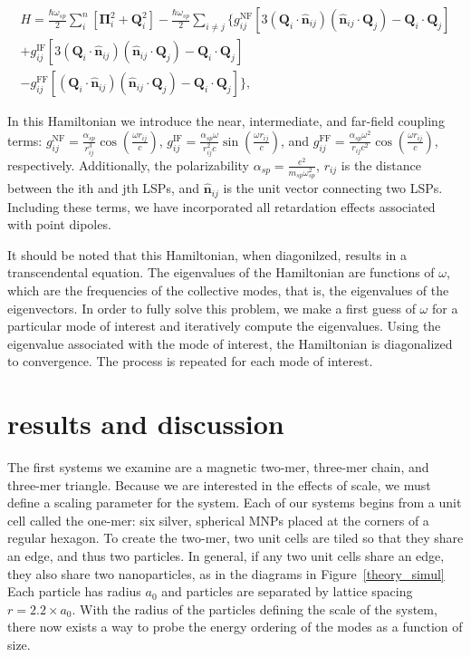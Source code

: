 \documentclass[journal=apchd5,manuscript=article]{achemso}
\begin{document}
\begin{equation}
\begin{aligned}
H = 
\frac{\hbar\omega_{sp}}{2}\sum_{i}^{n}[\boldsymbol{\Pi}_i^2 + \textbf{Q}_i^2] - \frac{\hbar\omega_{sp}}{2}\sum_{i\neq j}\{g_{ij}^{\textrm{NF}}\left[3(\textbf{Q}_i\cdot\hat{\textbf{n}}_{ij})(\hat{\textbf{n}}_{ij}\cdot\textbf{Q}_j) - \textbf{Q}_i\cdot\textbf{Q}_j\right] \\
+ g_{ij}^{\textrm{IF}}\left[3(\textbf{Q}_i\cdot\hat{\textbf{n}}_{ij})(\hat{\textbf{n}}_{ij}\cdot\textbf{Q}_j) -\textbf{Q}_i\cdot\textbf{Q}_j\right] \\ 
- g_{ij}^{\textrm{FF}}\left[(\textbf{Q}_i\cdot\hat{\textbf{n}}_{ij})(\hat{\textbf{n}}_{ij}\cdot\textbf{Q}_j) -\textbf{Q}_i\cdot\textbf{Q}_j\right]\},\label{elec_hammy_2}
\end{aligned}
\end{equation}

In this Hamiltonian we introduce the near, intermediate, and far-field coupling terms: $g_{ij}^{\textrm{NF}} = \frac{\alpha_{sp}}{r_{ij}^3}\cos\left(\frac{\omega r_{ij}}{c}\right)$, $g_{ij}^{\textrm{IF}} = \frac{\alpha_{sp}\omega}{r_{ij}^2 c}\sin\left(\frac{\omega r_{ij}}{c}\right)$, and $g_{ij}^{\textrm{FF}} = \frac{\alpha_{sp}\omega^2}{r_{ij} c^2}\cos\left(\frac{\omega r_{ij}}{c}\right)$, respectively. Additionally, the polarizability $\alpha_{sp} = \frac{e^2}{m_{sp}\omega_{sp}^2}$, $r_{ij}$ is the distance between the ith and jth LSPs, and $\hat{\textbf{n}}_{ij}$ is the unit vector connecting two LSPs. Including these terms, we have incorporated all retardation effects associated with point dipoles\cite{Purcell1973}.

It should be noted that this Hamiltonian, when diagonilzed, results in a transcendental equation. The eigenvalues of the Hamiltonian are functions of $\omega$, which are the frequencies of the collective modes, that is, the eigenvalues of the eigenvectors. In order to fully solve this problem, we make a first guess of $\omega$ for a particular mode of interest and iteratively compute the eigenvalues. Using the eigenvalue associated with the mode of interest, the Hamiltonian is diagonalized to convergence. The process is repeated for each mode of interest.

\section{results and discussion}
The first systems we examine are a magnetic two-mer\cite{Cherqui2014}, three-mer chain, and three-mer triangle. Because we are interested in the effects of scale, we must define a scaling parameter for the system. Each of our systems begins from a unit cell called the one-mer: six silver, spherical MNPs placed at the corners of a regular hexagon. To create the two-mer, two unit cells are tiled so that they share an edge, and thus two particles. In general, if any two unit cells share an edge, they also share two nanoparticles, as in the diagrams in Figure~\ref{theory_simul} Each particle has radius $a_0$ and particles are separated by lattice spacing $r=2.2\times a_0$. With the radius of the particles defining the scale of the system, there now exists a way to probe the energy ordering of the modes as a function of size.
\end{document}
